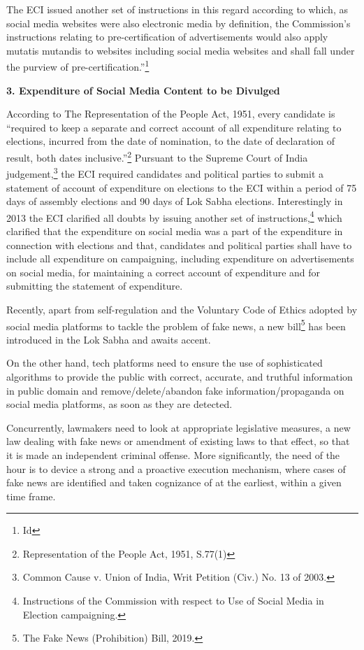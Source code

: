 \begin{multicols}{2}
\noi
The ECI issued another set of instructions in this regard according to which, as social media
websites were also electronic media by definition, the Commission’s instructions relating to 
pre-certification of advertisements would also apply mutatis mutandis to websites including
social media websites and shall fall under the purview of pre-certification.”\footnote{Id}

\noi
{\large\bfseries 3. Expenditure of Social Media Content to be Divulged}

\noi
According to The Representation of the People Act, 1951, every candidate is “required to
keep a separate and correct account of all expenditure relating to elections, incurred from the
date of nomination, to the date of declaration of result, both dates inclusive.”\footnote{Representation of the People Act, 1951, S.77(1)} Pursuant to
the Supreme Court of India judgement,\footnote{Common Cause v. Union of India, Writ Petition (Civ.) No. 13 of 2003.} the ECI required candidates and political parties to
submit a statement of account of expenditure on elections to the ECI within a period of 75
days of assembly elections and 90 days of Lok Sabha elections. Interestingly in 2013 the ECI
clarified all doubts by issuing another set of instructions,\footnote{Instructions of the Commission with respect to Use of Social Media in Election campaigning.} which clarified that the
expenditure on social media was a part of the expenditure in connection with elections and
that, candidates and political parties shall have to include all expenditure on campaigning,
including expenditure on advertisements on social media, for maintaining a correct account
of expenditure and for submitting the statement of expenditure.

\noi
Recently, apart from self-regulation and the Voluntary Code of Ethics adopted by social
media platforms to tackle the problem of fake news, a new bill\footnote{The Fake News (Prohibition) Bill, 2019.} has been introduced in the
Lok Sabha and awaits accent.

\noi
On the other hand, tech platforms need to ensure the use of sophisticated algorithms to
provide the public with correct, accurate, and truthful information in public domain and
remove/delete/abandon fake information/propaganda on social media platforms, as soon as
they are detected.

\newpage

\noi
Concurrently, lawmakers need to look at appropriate legislative measures, a new law dealing
with fake news or amendment of existing laws to that effect, so that it is made an independent
criminal offense. More significantly, the need of the hour is to device a strong and a proactive
execution mechanism, where cases of fake news are identified and taken cognizance of at the
earliest, within a given time frame. 

\end{multicols}
\label{end2020-art1}
